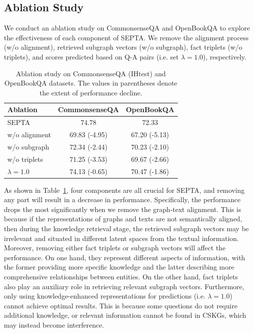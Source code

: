 \documentclass[runningheads]{llncs}
\begin{document}
\subsection{Ablation Study}
We conduct an ablation study on CommonsenseQA and OpenBookQA to explore the effectiveness of each component of SEPTA. We remove the alignment process (w/o alignment), retrieved subgraph vectors (w/o subgraph), fact triplets (w/o triplets), and scores predicted based on Q-A pairs (i.e. set $\lambda=1.0$), respectively.
\begin{table}[t!]
\centering
\caption{Ablation study on CommonsenseQA (IHtest) and OpenBookQA datasets. The values in parentheses denote the extent of performance decline.}
\resizebox{0.6\linewidth}{!} {
\begin{tabular}{lcc}
    \toprule  
    \textbf{Ablation}& \textbf{CommonsenseQA} & \textbf{OpenBookQA}\\
    \midrule
    SEPTA & 74.78 & 72.33 \\
    \midrule
    w/o alignment & 69.83 (-4.95) & 67.20 (-5.13) \\
    w/o subgraph  & 72.34 (-2.44) & 70.23 (-2.10) \\
    w/o triplets  & 71.25 (-3.53) & 69.67 (-2.66) \\
    $\lambda=1.0$ & 74.13 (-0.65) & 70.47 (-1.86)  \\
    \bottomrule 
\end{tabular}
}
\label{tab:ablation}
\end{table}

As shown in Table~\ref{tab:ablation}, four components are all crucial for SEPTA, and removing any part will result in a decrease in performance. Specifically, the performance drops the most significantly when we remove the graph-text alignment. This is because if the representations of graphs and texts are not semantically aligned, then during the knowledge retrieval stage, the retrieved subgraph vectors may be irrelevant and situated in different latent spaces from the textual information. Moreover, removing either fact triplets or subgraph vectors will affect the performance. On one hand, they represent different aspects of information, with the former providing more specific knowledge and the latter describing more comprehensive relationships between entities. On the other hand, fact triplets also play an auxiliary role in retrieving relevant subgraph vectors. Furthermore, only using knowledge-enhanced representations for predictions (i.e. $\lambda=1.0$) cannot achieve optimal results. This is because some questions do not require additional knowledge, or relevant information cannot be found in CSKGs, which may instead become interference.
\end{document}

